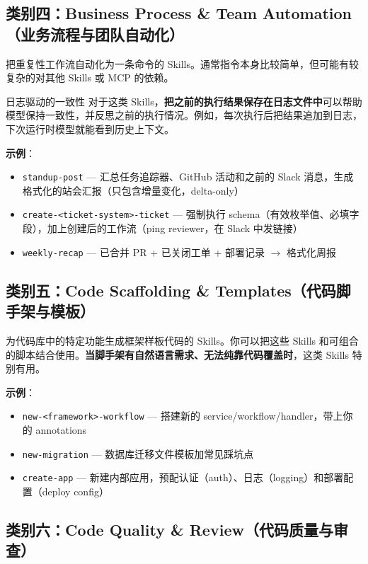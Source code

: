 \documentclass[a4paper]{article}
\begin{document}
\subsection{类别四：Business Process \& Team Automation（业务流程与团队自动化）}

把重复性工作流自动化为一条命令的 Skills。通常指令本身比较简单，但可能有较复杂的对其他 Skills 或 MCP 的依赖。

\begin{knowledgebox}{日志驱动的一致性}
对于这类 Skills，\textbf{把之前的执行结果保存在日志文件中}可以帮助模型保持一致性，并反思之前的执行情况。例如，每次执行后把结果追加到日志，下次运行时模型就能看到历史上下文。
\end{knowledgebox}

\textbf{示例}：
\begin{itemize}
    \item \texttt{standup-post} --- 汇总任务追踪器、GitHub 活动和之前的 Slack 消息，生成格式化的站会汇报（只包含增量变化，delta-only）
    \item \texttt{create-<ticket-system>-ticket} --- 强制执行 schema（有效枚举值、必填字段），加上创建后的工作流（ping reviewer，在 Slack 中发链接）
    \item \texttt{weekly-recap} --- 已合并 PR + 已关闭工单 + 部署记录 $\to$ 格式化周报
\end{itemize}

\subsection{类别五：Code Scaffolding \& Templates（代码脚手架与模板）}

为代码库中的特定功能生成框架样板代码的 Skills。你可以把这些 Skills 和可组合的脚本结合使用。\textbf{当脚手架有自然语言需求、无法纯靠代码覆盖时}，这类 Skills 特别有用。

\textbf{示例}：
\begin{itemize}
    \item \texttt{new-<framework>-workflow} --- 搭建新的 service/workflow/handler，带上你的 annotations
    \item \texttt{new-migration} --- 数据库迁移文件模板加常见踩坑点
    \item \texttt{create-app} --- 新建内部应用，预配认证（auth）、日志（logging）和部署配置（deploy config）
\end{itemize}

\subsection{类别六：Code Quality \& Review（代码质量与审查）}
\end{document}
